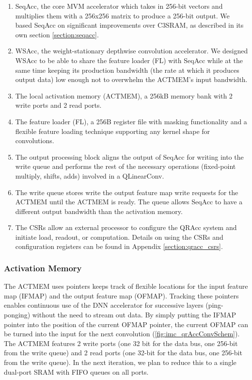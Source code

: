 \begin{enumerate}
    \item SeqAcc, the core MVM accelerator which takes in 256-bit vectors and multiplies them with a 256x256 matrix to produce a 256-bit output. We based SeqAcc on significant improvements over C3SRAM, as described in its own section \ref{section:seqacc}.
    \item WSAcc, the weight-stationary depthwise convolution accelerator. We designed WSAcc to be able to share the feature loader (FL) with SeqAcc while at the same time keeping its production bandwidth (the rate at which it produces output data) low enough not to overwhelm the ACTMEM's input bandwidth. 
    \item The local activation memory (ACTMEM), a 256kB memory bank with 2 write ports and 2 read ports. 
    \item The feature loader (FL), a 256B register file with masking functionality and a flexible feature loading technique supporting any kernel shape for convolutions.  
    \item The output processing block aligns the output of SeqAcc for writing into the write queue and performs the rest of the necessary operations (fixed-point multiply, shifts, adds) involved in a QLinearConv.
    \item The write queue stores write the output feature map write requests for the ACTMEM until the ACTMEM is ready. The queue allows SeqAcc to have a different output bandwidth than the activation memory.
    \item The CSRs allow an external processor to configure the QRAcc system and initiate load, readout, or computation. Details on using the CSRs and configuration registers can be found in Appendix \ref{section:qracc_csrs}.
\end{enumerate}

\subsubsection{Activation Memory}

The ACTMEM uses pointers keeps track of flexible locations for the input feature map (IFMAP) and the output feature map (OFMAP). Tracking these pointers enables continuous use of the DNN accelerator for successive layers (ping-ponging) without the need to stream out data. By simply putting the IFMAP pointer into the position of the current OFMAP pointer, the current OFMAP can be turned into the input for the next convolution (\ref{fig:imc_qrAccConvSchem}). The ACTMEM features 2 write ports (one 32 bit for the data bus, one 256-bit from the write queue) and 2 read ports (one 32-bit for the data bus, one 256-bit from the write queue). In the next iteration, we plan to reduce this to a single dual-port SRAM with FIFO queues on all ports.

